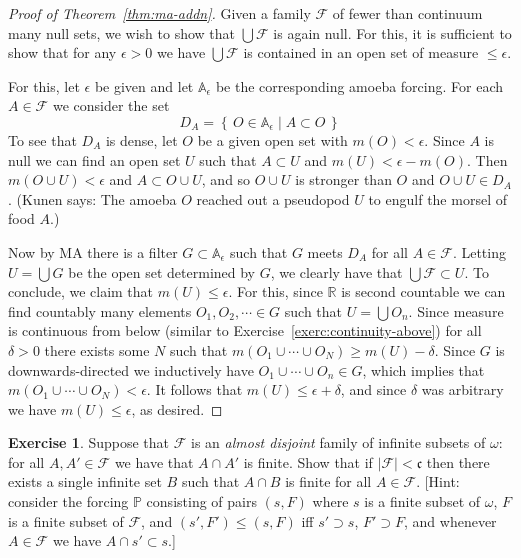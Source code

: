 \documentclass[11pt,oneside]{amsbook}
\newcommand{\set}[1]{\left\{\,#1\,\right\}}
\newcommand{\PP}{\mathbb P}
\theoremstyle{definition}
\newtheorem{exerc}{Exercise}[section]
\theoremstyle{plain}
\theoremstyle{definition}
\theoremstyle{remark}
\numberwithin{equation}{section}
\numberwithin{figure}{section}
\begin{document}
\begin{proof}[Proof of Theorem~\ref{thm:ma-addn}]
  Given a family $\mathcal F$ of fewer than continuum many null sets, we wish to show that $\bigcup\mathcal F$ is again null. For this, it is sufficient to show that for any $\epsilon>0$ we have $\bigcup\mathcal F$ is contained in an open set of measure $\leq\epsilon$.

  For this, let $\epsilon$ be given and let $\mathbb A_\epsilon$ be the corresponding amoeba forcing. For each $A\in\mathcal F$ we consider the set
  \[D_A=\set{O\in\mathbb A_\epsilon\mid A\subset O}
  \]
  To see that $D_A$ is dense, let $O$ be a given open set with $m(O)<\epsilon$. Since $A$ is null we can find an open set $U$ such that $A\subset U$ and $m(U)<\epsilon-m(O)$. Then $m(O\cup U)<\epsilon$ and $A\subset O\cup U$, and so $O\cup U$ is stronger than $O$ and $O\cup U\in D_A$. (Kunen says: The amoeba $O$ reached out a pseudopod $U$ to engulf the morsel of food $A$.)

  Now by MA there is a filter $G\subset\mathbb A_\epsilon$ such that $G$ meets $D_A$ for all $A\in\mathcal F$. Letting $U=\bigcup G$ be the open set determined by $G$, we clearly have that $\bigcup\mathcal F\subset U$. To conclude, we claim that $m(U)\leq\epsilon$. For this, since $\mathbb R$ is second countable we can find countably many elements $O_1,O_2,\cdots\in G$ such that $U=\bigcup O_n$. Since measure is continuous from below (similar to Exercise~\ref{exerc:continuity-above}) for all $\delta>0$ there exists some $N$ such that $m(O_1\cup\cdots\cup O_N)\geq m(U)-\delta$. Since $G$ is downwards-directed we inductively have $O_1\cup\cdots\cup O_n\in G$, which implies that $m(O_1\cup\cdots\cup O_N)<\epsilon$. It follows that $m(U)\leq\epsilon+\delta$, and since $\delta$ was arbitrary we have $m(U)\leq\epsilon$, as desired.
\end{proof}

\begin{exerc}
  Suppose that $\mathcal F$ is an \emph{almost disjoint} family of infinite subsets of $\omega$: for all $A,A'\in\mathcal F$ we have that $A\cap A'$ is finite. Show that if $|\mathcal F|<\mathfrak c$ then there exists a single infinite set $B$ such that $A\cap B$ is finite for all $A\in\mathcal F$. [Hint: consider the forcing $\PP$ consisting of pairs $(s,F)$ where $s$ is a finite subset of $\omega$, $F$ is a finite subset of $\mathcal F$, and $(s',F')\leq(s,F)$ iff $s'\supset s$, $F'\supset F$, and whenever $A\in\mathcal F$ we have $A\cap s'\subset s$.]
\end{exerc}
\end{document}
